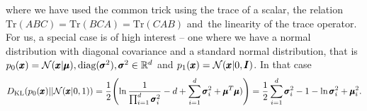 where we have used the common trick using the trace of a scalar, the relation $\text{Tr}(ABC)=\text{Tr}(BCA)=\text{Tr}(CAB)$ and~the linearity of the trace operator. For us, a special case is of high interest -- one where we have a normal distribution with diagonal covariance and a standard normal distribution, that is $p_{0}(\pmb{{x}})=\mathcal{N}(\pmb{{x}}|\pmb{{\mu}}),\text{diag}(\pmb{{\sigma}}^{2}),\pmb{{\sigma}}^{2}\in\mathbb{R}^{d}$
and $p_{1}(\pmb{{x}})=\mathcal{N}(\pmb{{x}}|0,\pmb{{I}})$. In that case
\begin{equation}
D_{\text{KL}}(p_{0}(\vc{x})||\mathcal{N}(\vc{x}|0,1))=\frac{1}{2}\left(\ln\frac{1}{\prod_{i=1}^{d}\vc{\sigma}_{i}^{2}}-d+\sum_{i=1}^{d}\vc{\sigma}_{i}^{2}+\vc{\mu}^{T}\vc{\mu})\right)=\frac{1}{2}\sum_{i=1}^{d}\vc{\sigma}_{i}^{2}-1-\ln\vc{\sigma}_{i}^{2}+\vc{\mu}_{i}^{2}.\label{eq:kl_standard}
\end{equation}
